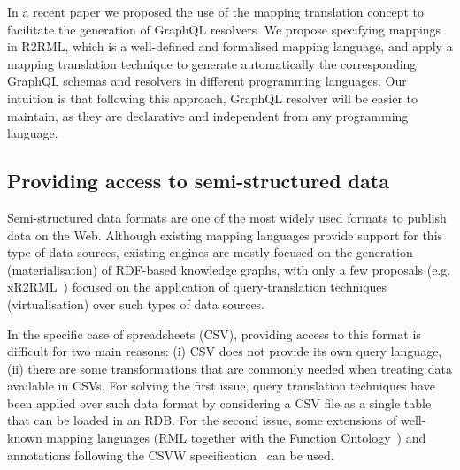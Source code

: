 In a recent paper \citep{priyatna2019morph} we proposed the use of the mapping translation concept to facilitate the generation of GraphQL resolvers. We propose specifying mappings in R2RML, which is a well-defined and formalised mapping language, and apply a mapping translation technique to generate automatically the corresponding GraphQL schemas and resolvers in different programming languages. Our intuition is that following this approach, GraphQL resolver will be easier to maintain, as they are declarative and independent from any programming language. 

\subsection{Providing access to semi-structured data}
Semi-structured data formats are one of the most widely used formats to publish data on the Web. Although existing mapping languages provide support for this type of data sources, existing engines are mostly focused on the generation (materialisation) of RDF-based knowledge graphs, with only a  few proposals (e.g. xR2RML~\citep{michel2015translation}) focused on the application of query-translation techniques (virtualisation) over such types of data sources.

In the specific case of spreadsheets (CSV), providing access to this format is difficult for two main reasons: (i) CSV does not provide its own query language, (ii) there are some transformations that are commonly needed when treating data available in CSVs. For solving the first issue, query translation techniques have been applied over such data format by considering a CSV file as a single table that can be loaded in an RDB. For the second issue, some extensions of well-known mapping languages (RML together with the Function Ontology~\citep{de2017declarative}) and annotations following the CSVW specification~\citep{tennison2015model} can be used.

